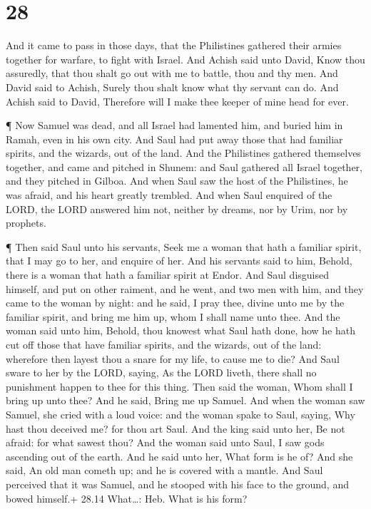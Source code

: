\hypertarget{section-27}{%
\section{28}\label{section-27}}

 And it came to pass in those days, that the Philistines
gathered their armies together for warfare, to fight with Israel. And
Achish said unto David, Know thou assuredly, that thou shalt go out with
me to battle, thou and thy men.  And David said to Achish,
Surely thou shalt know what thy servant can do. And Achish said to
David, Therefore will I make thee keeper of mine head for ever.

 ¶ Now Samuel was dead, and all Israel had lamented him, and
buried him in Ramah, even in his own city. And Saul had put away those
that had familiar spirits, and the wizards, out of the land.
 And the Philistines gathered themselves together, and came
and pitched in Shunem: and Saul gathered all Israel together, and they
pitched in Gilboa.  And when Saul saw the host of the
Philistines, he was afraid, and his heart greatly trembled. 
And when Saul enquired of the LORD, the LORD answered him not, neither
by dreams, nor by Urim, nor by prophets.

 ¶ Then said Saul unto his servants, Seek me a woman that
hath a familiar spirit, that I may go to her, and enquire of her. And
his servants said to him, Behold, there is a woman that hath a familiar
spirit at Endor.  And Saul disguised himself, and put on
other raiment, and he went, and two men with him, and they came to the
woman by night: and he said, I pray thee, divine unto me by the familiar
spirit, and bring me him up, whom I shall name unto thee. 
And the woman said unto him, Behold, thou knowest what Saul hath done,
how he hath cut off those that have familiar spirits, and the wizards,
out of the land: wherefore then layest thou a snare for my life, to
cause me to die?  And Saul sware to her by the LORD,
saying, As the LORD liveth, there shall no punishment happen to thee for
this thing.  Then said the woman, Whom shall I bring up
unto thee? And he said, Bring me up Samuel.  And when the
woman saw Samuel, she cried with a loud voice: and the woman spake to
Saul, saying, Why hast thou deceived me? for thou art Saul.
 And the king said unto her, Be not afraid: for what sawest
thou? And the woman said unto Saul, I saw gods ascending out of the
earth.  And he said unto her, What form is he of? And she
said, An old man cometh up; and he is covered with a mantle. And Saul
perceived that it was Samuel, and he stooped with his face to the
ground, and bowed himself.+ 28.14 What\ldots: Heb. What is his form?


